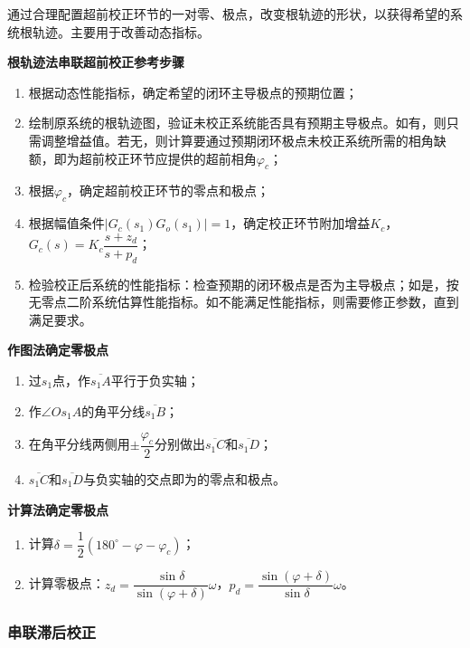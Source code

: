 \documentclass[cn, blue, normal, 12pt]{elegantnote}
\begin{document}
通过合理配置超前校正环节的一对零、极点，改变根轨迹的形状，以获得希望的系统根轨迹。主要用于改善动态指标。

\textbf{根轨迹法串联超前校正参考步骤}

\begin{enumerate}
    \setlength{\itemsep}{6pt}
    \item 根据动态性能指标，确定希望的闭环主导极点的预期位置；
    \item 绘制原系统的根轨迹图，验证未校正系统能否具有预期主导极点。如有，则只需调整增益值。若无，则计算要通过预期闭环极点未校正系统所需的相角缺额，即为超前校正环节应提供的超前相角$\varphi_c$；
    \item 根据$\varphi_c$，确定超前校正环节的零点和极点；
    \item 根据幅值条件$|G_c(s_1)G_o(s_1)|=1$，确定校正环节附加增益$K_c$，$G_c(s)=K_c\dfrac{s+z_d}{s+p_d}$；
    \item 检验校正后系统的性能指标：检查预期的闭环极点是否为主导极点；如是，按无零点二阶系统估算性能指标。如不能满足性能指标，则需要修正参数，直到满足要求。
\end{enumerate}

\textbf{作图法确定零极点}

\begin{enumerate}
    \setlength{\itemsep}{6pt}
    \item 过$s_1$点，作$\overline{s_1 A}$平行于负实轴；
    \item 作$\angle O s_1 A$的角平分线$\overline{s_1 B}$；
    \item 在角平分线两侧用$\pm\dfrac{\varphi_c}{2}$分别做出$\overline{s_1 C}$和$\overline{s_1 D}$；
    \item $\overline{s_1 C}$和$\overline{s_1 D}$与负实轴的交点即为的零点和极点。
\end{enumerate}

\textbf{计算法确定零极点}

\begin{enumerate}
    \setlength{\itemsep}{6pt}
    \item 计算$\delta=\dfrac{1}{2}(180^{\circ}-\varphi-\varphi_c)$；
    \item 计算零极点：$z_d=\dfrac{\sin{\delta}}{\sin{(\varphi+\delta)}}\omega$，$p_d=\dfrac{\sin{(\varphi+\delta)}}{\sin{\delta}}\omega$。
\end{enumerate}

\subsubsection{串联滞后校正}
\end{document}
